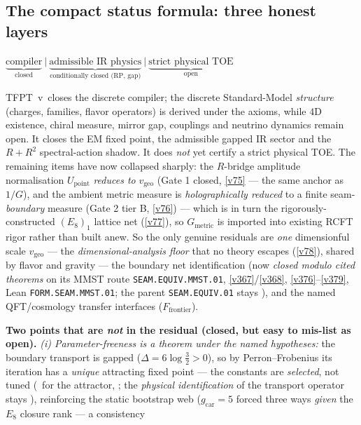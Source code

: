 \documentclass[11pt,a4paper]{article}
\newcommand{\gcar}{g_{\mathrm{car}}}
\begin{document}
\subsection*{The compact status formula: three honest layers}
\begin{keyeq}
$\displaystyle \underbrace{\text{compiler}}_{\text{closed}}\ \Big|\
  \underbrace{\text{admissible IR physics}}_{\text{conditionally closed (RP, gap)}}\ \Big|\
  \underbrace{\text{strict physical TOE}}_{\text{open}}$
\end{keyeq}
TFPT~v\TFPTversion\ closes the discrete compiler; the discrete Standard-Model \emph{structure} (charges, families, flavor operators) is derived under the axioms, while $4$D existence, chiral measure, mirror gap, couplings and neutrino dynamics remain open.  It closes the EM fixed point, the
admissible gapped IR sector and the $R+R^2$ spectral-action shadow. It does \emph{not} yet certify a strict
physical TOE. The remaining items have now collapsed sharply: the $R$-bridge amplitude normalisation
$U_{\mathrm{point}}$ \emph{reduces to} $v_{\mathrm{geo}}$ (Gate 1 closed, \vref{v75} --- the same anchor as $1/G$), and
the ambient metric measure is \emph{holographically reduced} to a finite seam-\emph{boundary} measure (Gate 2
tier B, \vref{v76}) --- which is in turn the rigorously-constructed $(E_8)_1$ lattice net (\vref{v77}), so $G_{\mathrm{metric}}$
is imported into existing RCFT rigor rather than built anew. So the only genuine residuals are \emph{one}
dimensionful scale $v_{\mathrm{geo}}$ --- the \emph{dimensional-analysis floor} that no theory escapes (\vref{v78}),
shared by flavor and gravity --- the boundary net identification (now \emph{closed modulo cited theorems} on its
MMST route \texttt{SEAM.EQUIV.MMST.01},
\vref{v367}/\vref{v368}, \vref{v376}--\vref{v379}, Lean \texttt{FORM.SEAM.MMST.01}; the parent
\texttt{SEAM.EQUIV.01} stays \mO), and the named QFT/cosmology transfer
interfaces ($F_{\mathrm{frontier}}$).
\par\smallskip\noindent\textbf{Two points that are \emph{not} in the residual (closed, but easy to mis-list as open).}
\emph{(i) Parameter-freeness is a theorem under the named hypotheses:} the boundary transport is gapped
($\Delta=6\log\tfrac32>0$), so by Perron--Frobenius its iteration has a \emph{unique} attracting fixed point
--- the constants are \emph{selected}, not tuned (\mE\ for the attractor, ;
the \emph{physical identification} of the transport operator stays \mC), reinforcing the
static bootstrap web ($\gcar=5$ forced three ways \emph{given} the $E_8$ closure rank --- a consistency
\end{document}
